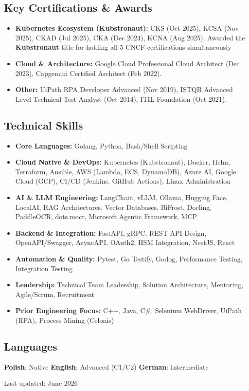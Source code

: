 \documentclass[10pt,a4paper]{article}
\providecommand{\tightlist}{%
  \setlength{\itemsep}{0pt}\setlength{\parskip}{0pt}}
\begin{document}
\subsection{Key Certifications \&
Awards}\label{key-certifications-awards}

\begin{itemize}
\item
  \textbf{Kubernetes Ecosystem (Kubstronaut):} CKS (Oct 2025), KCSA (Nov
  2025), CKAD (Jul 2025), CKA (Dec 2024), KCNA (Aug 2025). Awarded the
  \textbf{Kubstronaut} title for holding all 5 CNCF certifications
  simultaneously
\item
  \textbf{Cloud \& Architecture:} Google Cloud Professional Cloud
  Architect (Dec 2023), Capgemini Certified Architect (Feb 2022).
\item
  \textbf{Other:} UiPath RPA Developer Advanced (Nov 2019), ISTQB
  Advanced Level Technical Test Analyst (Oct 2014), ITIL Foundation (Oct
  2021).
\end{itemize}

\subsection{Technical Skills}\label{technical-skills}

\begin{itemize}
\tightlist
\item
  \textbf{Core Languages:} Golang, Python, Bash/Shell Scripting
\item
  \textbf{Cloud Native \& DevOps:} Kubernetes (Kubstronaut), Docker,
  Helm, Terraform, Ansible, AWS (Lambda, ECS, DynamoDB), Azure AI,
  Google Cloud (GCP), CI/CD (Jenkins, GitHub Actions), Linux
  Administration
\item
  \textbf{AI \& LLM Engineering:} LangChain, vLLM, Ollama, Hugging Face,
  LocalAI, RAG Architectures, Vector Databases, BiFrost, Docling,
  PaddleOCR, dots.mocr, Microsoft Agentic Framework, MCP
\item
  \textbf{Backend \& Integration:} FastAPI, gRPC, REST API Design,
  OpenAPI/Swagger, AsyncAPI, OAuth2, HSM Integration, NestJS, React
\item
  \textbf{Automation \& Quality:} Pytest, Go Testify, Godog, Performance
  Testing, Integration Testing
\item
  \textbf{Leadership:} Technical Team Leadership, Solution Architecture,
  Mentoring, Agile/Scrum, Recruitment
\item
  \textbf{Prior Engineering Focus:} C++, Java, C\#, Selenium WebDriver,
  UiPath (RPA), Process Mining (Celonis)
\end{itemize}

\subsection{Languages}\label{languages}

\textbf{Polish}: Native \textbar{} \textbf{English}: Advanced (C1/C2)
\textbar{} \textbf{German}: Intermediate

Last updated: June 2026
\end{document}
